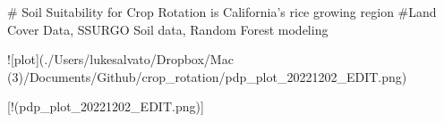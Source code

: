 # Soil Suitability for Crop Rotation is California's rice growing region
#Land Cover Data, SSURGO Soil data, Random Forest modeling



![plot](./Users/lukesalvato/Dropbox/Mac (3)/Documents/Github/crop_rotation/pdp_plot_20221202_EDIT.png)

[!(pdp_plot_20221202_EDIT.png)]